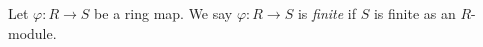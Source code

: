 \begin{definition}
\label{definition-finite-ring-map}
Let $\varphi : R \to S$ be a ring map. We say $\varphi : R \to S$ is
{\it finite} if $S$ is finite as an $R$-module.
\end{definition}
